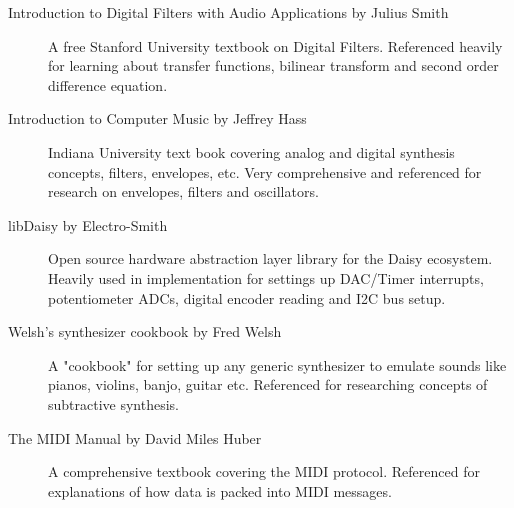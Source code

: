 \documentclass[acmlarge,screen]{acmart}
\begin{document}
\begin{description}
		\item[Introduction to Digital Filters with Audio Applications by Julius Smith] A free Stanford University textbook on Digital Filters. Referenced heavily for learning about transfer functions, bilinear transform and second order difference equation.
		\item[Introduction to Computer Music by Jeffrey Hass] Indiana University text book covering analog and digital synthesis concepts, filters, envelopes, etc. Very comprehensive and referenced for research on envelopes, filters and oscillators.
		\item[libDaisy by Electro-Smith] Open source hardware abstraction layer library for the Daisy ecosystem. Heavily used in implementation for settings up DAC/Timer interrupts, potentiometer ADCs, digital encoder reading and I2C bus setup.
		\item[Welsh's synthesizer cookbook by Fred Welsh] A "cookbook" for setting up any generic synthesizer to emulate sounds like pianos, violins, banjo, guitar etc. Referenced for researching concepts of subtractive synthesis.
		\item[The MIDI Manual by David Miles Huber] A comprehensive textbook covering the MIDI protocol. Referenced for explanations of how data is packed into MIDI messages.
	\end{description}
\end{document}
